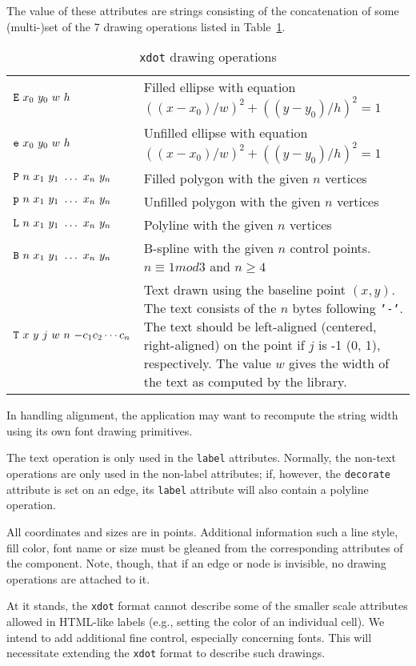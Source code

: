 The value of these attributes are strings consisting of the concatenation of 
some (multi-)set of the 7 drawing operations listed in Table~\ref{table:xops}. 
\begin{table}[htb]
\centering
\begin{tabular}[t]{|lp{4.5in}|} \hline
${\tt E}\ x_0\ y_0\ w\ h$ &  Filled ellipse with equation
$((x - x_0)/w)^2 + ((y - y_0)/h)^2 = 1$ \\
${\tt e}\ x_0\ y_0\ w\ h$ & Unfilled ellipse with equation
$((x - x_0)/w)^2 + ((y - y_0)/h)^2 = 1$ \\
${\tt P}\ n\ x_1\ y_1\ \ldots\ x_n\ y_n$ & Filled polygon with the
given $n$ vertices \\
${\tt p}\ n\ x_1\ y_1\ \ldots\ x_n\ y_n$ & Unfilled polygon with the
given $n$ vertices \\
${\tt L}\ n\ x_1\ y_1\ \ldots\ x_n\ y_n$ & Polyline with the
given $n$ vertices \\
${\tt B}\ n\ x_1\ y_1\ \ldots\ x_n\ y_n$ & B-spline with the
given $n$ control points. $n \equiv 1 mod 3$ and $n \geq 4$ \\
${\tt T}\ x\ y\ j\ w\ n\ {\tt -}c_{1}c_{2}\cdots c_{n}$ &
Text drawn using the baseline point $(x,y)$. The text consists of the 
$n$ bytes following {\tt '-'}. The text should be left-aligned (centered,
right-aligned) on the point if $j$ is -1 (0, 1), respectively. The 
value $w$ gives the width of the text as computed by the library.  \\
\hline
\end{tabular}
\caption{{\tt xdot} drawing operations}
\label{table:xops}
\end{table}

In handling alignment, the application may want to recompute the string 
width using its own font drawing primitives. 

The text operation is only used in the {\tt label} attributes. 
Normally, the non-text operations are only used in the non-label attributes; 
if, however, the {\tt decorate} attribute is set on an edge, its 
{\tt label} attribute will also contain a polyline operation. 

All coordinates and sizes are in points. Additional information such a 
line style, fill color, font name or size must be gleaned from the 
corresponding attributes of the component. Note, though, that if an edge or 
node is invisible, no drawing operations are attached to it.

At it stands, the {\tt xdot} format cannot describe some of the smaller
scale attributes allowed in HTML-like labels (e.g., setting the color
of an individual cell). We intend to add additional fine control, especially
concerning fonts. This will necessitate extending the {\tt xdot}
format to describe such drawings.

